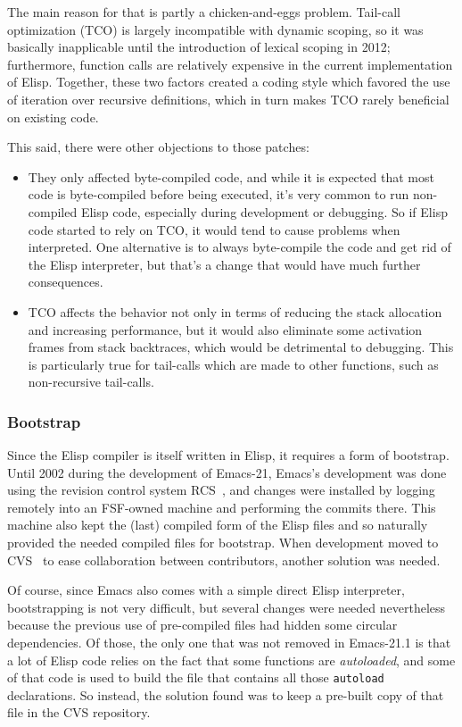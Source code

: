 \documentclass[format=acmsmall, review=false, screen=true]{acmart}
\newcommand \Elisp {Elisp}
\begin{document}
The main reason for that is partly a chicken-and-eggs problem.  Tail-call
optimization (TCO) is largely incompatible with dynamic scoping, so it was
basically inapplicable until the introduction of lexical scoping in 2012;
furthermore, function calls are relatively expensive in the current
implementation of \Elisp{}.  Together, these two factors created a coding
style which favored the use of iteration over recursive definitions, which
in turn makes TCO rarely beneficial on existing code.

This said, there were other objections to those patches:
\begin{itemize}
\item They only affected byte-compiled code, and while it is expected that
  most code is byte-compiled before being executed, it's very common to run
  non-compiled \Elisp{} code, especially during development or debugging.
  So if \Elisp{} code started to rely on TCO, it would tend to cause problems
  when interpreted.  One alternative is to always byte-compile the code and
  get rid of the \Elisp{} interpreter, but that's a change that would have
  much further consequences.
\item TCO affects the behavior not only in terms of reducing the stack
  allocation and increasing performance, but it would also eliminate some
  activation frames from stack backtraces, which would be detrimental to
  debugging.  This is particularly true for tail-calls which are made to
  other functions, such as non-recursive tail-calls.
\end{itemize}

\subsubsection{Bootstrap}

Since the \Elisp{} compiler is itself written in \Elisp{}, it requires
a form of bootstrap.  Until 2002 during the development of Emacs-21, Emacs's
development was done using the revision control system RCS~\cite{Tichy85}, and
changes were installed by logging remotely into an FSF-owned machine and
performing the commits there.  This machine also kept the (last) compiled
form of the \Elisp{} files and so naturally provided the needed compiled
files for bootstrap.  When development moved to CVS~\cite{Berliner90} to ease
collaboration between contributors, another solution was needed.

Of course, since Emacs also comes with a simple direct \Elisp{} interpreter,
bootstrapping is not very difficult, but several changes were needed
nevertheless because the previous use of pre-compiled files had hidden some
circular dependencies.  Of those, the only one that was not removed in
Emacs-21.1 is that a lot of \Elisp{} code relies on the fact that some
functions are \emph{autoloaded}, and some of that code is used to build the
file that contains all those \texttt{autoload} declarations.  So instead,
the solution found was to keep a pre-built copy of that file in the
CVS repository.
\end{document}
